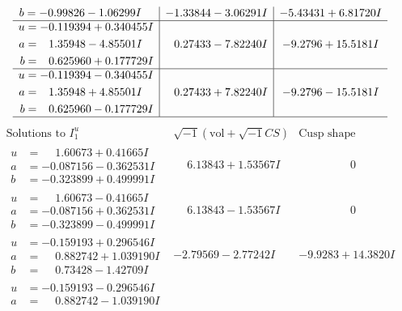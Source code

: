 \documentclass[1p]{elsarticle_modified}
\theoremstyle{definition}
\newcommand{\I}{\sqrt{-1}}
\begin{document}
$$\begin{array}{c|c|c}
\begin{aligned}
b &= -0.99826 - 1.06299 I\end{aligned}
 & -1.33844 - 3.06291 I & -5.43431 + 6.81720 I \\ \hline\begin{aligned}
u &= -0.119394 + 0.340455 I \\
a &= \phantom{-}1.35948 - 4.85501 I \\
b &= \phantom{-}0.625960 + 0.177729 I\end{aligned}
 & \phantom{-}0.27433 - 7.82240 I & -9.2796 + 15.5181 I \\ \hline\begin{aligned}
u &= -0.119394 - 0.340455 I \\
a &= \phantom{-}1.35948 + 4.85501 I \\
b &= \phantom{-}0.625960 - 0.177729 I\end{aligned}
 & \phantom{-}0.27433 + 7.82240 I & -9.2796 - 15.5181 I\\
 \hline 
 \end{array}$$\newpage$$\begin{array}{c|c|c}  
\text{Solutions to }I^u_{1}& \I (\text{vol} + \sqrt{-1}CS) & \text{Cusp shape}\\
 \hline 
\begin{aligned}
u &= \phantom{-}1.60673 + 0.41665 I \\
a &= -0.087156 - 0.362531 I \\
b &= -0.323899 + 0.499991 I\end{aligned}
 & \phantom{-}6.13843 + 1.53567 I & \phantom{-0.000000 } 0 \\ \hline\begin{aligned}
u &= \phantom{-}1.60673 - 0.41665 I \\
a &= -0.087156 + 0.362531 I \\
b &= -0.323899 - 0.499991 I\end{aligned}
 & \phantom{-}6.13843 - 1.53567 I & \phantom{-0.000000 } 0 \\ \hline\begin{aligned}
u &= -0.159193 + 0.296546 I \\
a &= \phantom{-}0.882742 + 1.039190 I \\
b &= \phantom{-}0.73428 - 1.42709 I\end{aligned}
 & -2.79569 - 2.77242 I & -9.9283 + 14.3820 I \\ \hline\begin{aligned}
u &= -0.159193 - 0.296546 I \\
a &= \phantom{-}0.882742 - 1.039190 I \\

\end{aligned}
\end{array}$$
\end{document}
